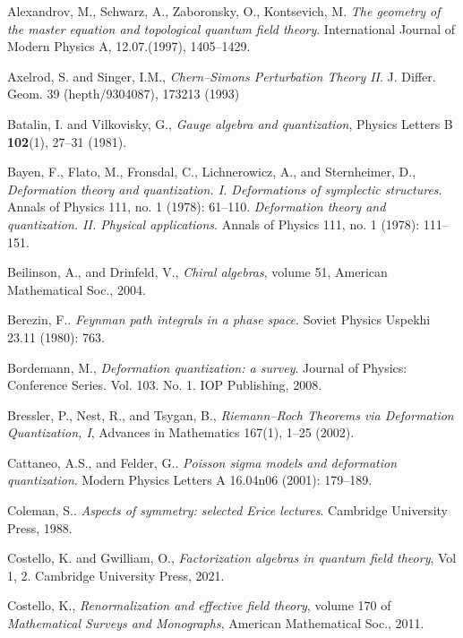 \begingroup
\small
\begin{enumerate}[label={[\arabic*]},leftmargin=2.8em,itemsep=0.18em,topsep=0.4em]
  \item Alexandrov, M., Schwarz, A., Zaboronsky, O., Kontsevich, M.
        \textit{The geometry of the master equation and topological quantum field
        theory}. International Journal of Modern Physics A, 12.07.(1997), 1405--1429.
  \item Axelrod, S. and Singer, I.M., \textit{Chern--Simons Perturbation Theory II}.
        J. Differ. Geom. 39 (hepth/9304087), 173213 (1993)
  \item Batalin, I. and Vilkovisky, G., \textit{Gauge algebra and quantization},
        Physics Letters B \textbf{102}(1), 27--31 (1981).
  \item Bayen, F., Flato, M., Fronsdal, C., Lichnerowicz, A., and Sternheimer, D.,
        \textit{Deformation theory and quantization. I. Deformations of symplectic
        structures}. Annals of Physics 111, no. 1 (1978): 61--110.
        \textit{Deformation theory and quantization. II. Physical applications}.
        Annals of Physics 111, no. 1 (1978): 111--151.
  \item Beilinson, A., and Drinfeld, V., \textit{Chiral algebras}, volume 51,
        American Mathematical Soc., 2004.
  \item Berezin, F.. \textit{Feynman path integrals in a phase space}. Soviet
        Physics Uspekhi 23.11 (1980): 763.
  \item Bordemann, M., \textit{Deformation quantization: a survey}. Journal of
        Physics: Conference Series. Vol. 103. No. 1. IOP Publishing, 2008.
  \item Bressler, P., Nest, R., and Tsygan, B., \textit{Riemann--Roch Theorems via
        Deformation Quantization, I}, Advances in Mathematics 167(1), 1--25 (2002).
  \item Cattaneo, A.S., and Felder, G.. \textit{Poisson sigma models and deformation
        quantization}. Modern Physics Letters A 16.04n06 (2001): 179--189.
  \item Coleman, S.. \textit{Aspects of symmetry: selected Erice lectures}.
        Cambridge University Press, 1988.
  \item Costello, K. and Gwilliam, O., \textit{Factorization algebras in quantum
        field theory}, Vol 1, 2. Cambridge University Press, 2021.
  \item Costello, K., \textit{Renormalization and effective field theory}, volume 170
        of \textit{Mathematical Surveys and Monographs}, American Mathematical Soc., 2011.

\end{enumerate}
